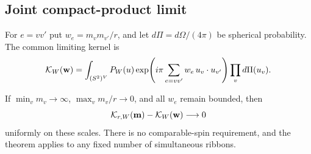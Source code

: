 \subsection{Joint compact-product limit}

For \(e=vv'\) put \(w_e=m_vm_{v'}/r\), and let \(d\Pi=d\Omega/(4\pi)\) be spherical probability. The common limiting kernel is
\begin{equation}
 \label{eq:ang:angular-kernel}
 {\cal K}_{W}(\mathbf w)=
  \int_{(S^2)^V}P_W(u)
    \exp\!\left(i\pi\sum_{e=vv'} w_e\,u_v\cdot u_{v'}\right)
                                               \prod_v d\Pi(u_v).
\end{equation}

\begin{theorem}\label{thm:ang:compact}
If \(\min_v m_v\to\infty\), \(\max_v m_v/r\to0\), and all \(w_e\) remain bounded, then
\[
       {\cal K}_{r,W}(\mathbf m)-{\cal K}_W(\mathbf w)\longrightarrow0
\]
uniformly on these scales. There is no comparable-spin requirement, and the theorem applies to any fixed number of simultaneous ribbons.
\end{theorem}


